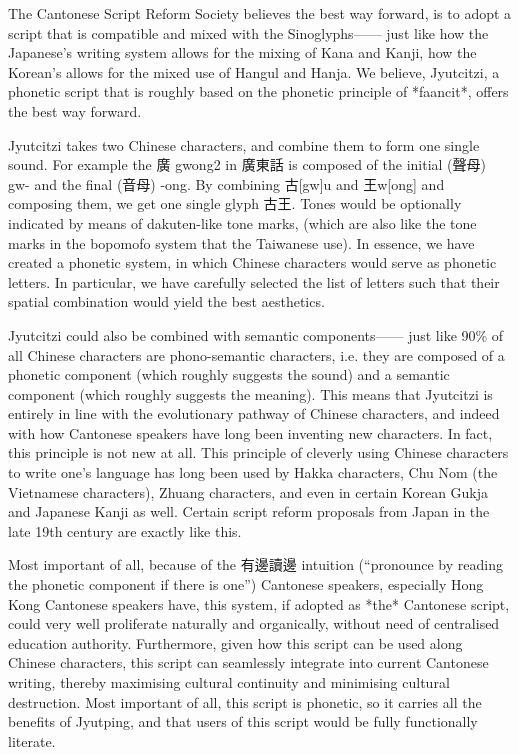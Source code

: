The Cantonese Script Reform Society believes the best way forward, is to adopt a script that is compatible and mixed with the Sinoglyphs—— just like how the Japanese’s writing system allows for the mixing of Kana and Kanji, how the Korean’s allows for the mixed use of Hangul and Hanja. We believe, Jyutcitzi, a phonetic script that is roughly based on the phonetic principle of *faancit*, offers the best way forward.

Jyutcitzi takes two Chinese characters, and combine them to form one single sound. For example the 廣 gwong2 in 廣東話 is composed of the initial (聲母) gw- and the final (音母) -ong. By combining 古[gw]u and 王w[ong] and composing them, we get one single glyph 古王. Tones would be optionally indicated by means of dakuten-like tone marks, (which are also like the tone marks in the bopomofo system that the Taiwanese use). In essence, we have created a phonetic system, in which Chinese characters would serve as phonetic letters. In particular, we have carefully selected the list of letters such that their spatial combination would yield the best aesthetics.

Jyutcitzi could also be combined with semantic components—— just like 90\% of all Chinese characters are phono-semantic characters, i.e. they are composed of a phonetic component (which roughly suggests the sound) and a semantic component (which roughly suggests the meaning). This means that Jyutcitzi is entirely in line with the evolutionary pathway of Chinese characters, and indeed with how Cantonese speakers have long been inventing new characters. In fact, this principle is not new at all. This principle of cleverly using Chinese characters to write one’s language has long been used by Hakka characters, Chu Nom (the Vietnamese characters), Zhuang characters, and even in certain Korean Gukja and Japanese Kanji as well. Certain script reform proposals from Japan in the late 19th century are exactly like this.

Most important of all, because of the 有邊讀邊 intuition (“pronounce by reading the phonetic component if there is one”) Cantonese speakers, especially Hong Kong Cantonese speakers have, this system, if adopted as *the* Cantonese script, could very well proliferate naturally and organically, without need of centralised education authority. Furthermore, given how this script can be used along Chinese characters, this script can seamlessly integrate into current Cantonese writing, thereby maximising cultural continuity and minimising cultural destruction. Most important of all, this script is phonetic, so it carries all the benefits of Jyutping, and that users of this script would be fully functionally literate.

